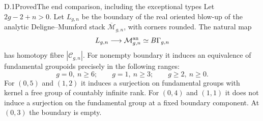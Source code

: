 \begin{result}{D.1}{Proved}{The end comparison, including the exceptional types}
Let $2g-2+n>0$. Let $L_{g,n}$ be the boundary of the real oriented blow-up of the analytic Deligne--Mumford stack $\overline{\mathcal M}_{g,n}$, with corners rounded. The natural map
\[
 L_{g,n}\longrightarrow\mathcal M_{g,n}^{\rm an}\simeq B\Gamma_{g,n}
\]
has homotopy fibre $|\mathcal C_{g,n}|$. For nonempty boundary it induces an equivalence of fundamental groupoids precisely in the following ranges:
\[
 g=0,\ n\geq6;\qquad g=1,\ n\geq3;\qquad g\geq2,\ n\geq0.
\]
For $(0,5)$ and $(1,2)$ it induces a surjection on fundamental groups with kernel a free group of countably infinite rank. For $(0,4)$ and $(1,1)$ it does not induce a surjection on the fundamental group at a fixed boundary component. At $(0,3)$ the boundary is empty.
\end{result}
